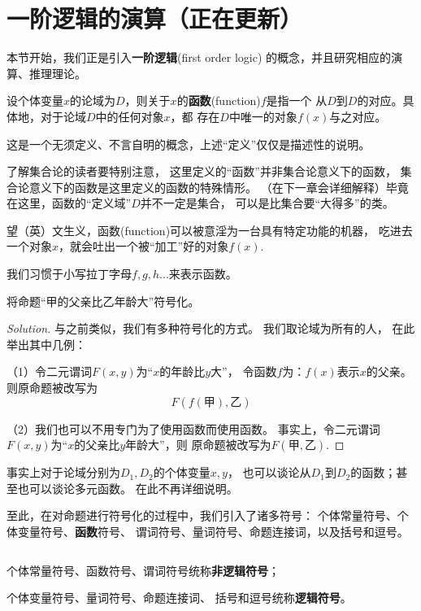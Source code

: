 \section{一阶逻辑的演算（正在更新）}

本节开始，我们正是引入\textbf{一阶逻辑}(first order logic)
的概念，并且研究相应的演算、推理理论。

\begin{definition}[函数与函数符号]
设个体变量$x$的论域为$D$，则关于$x$的\textbf{函数}(function)$f$是指一个
从$D$到$D$的对应。具体地，对于论域$D$中的任何对象$x$，都
存在$D$中唯一的对象$f(x)$与之对应。
\end{definition}

这是一个无须定义、不言自明的概念，上述“定义”仅仅是描述性的说明。

了解集合论的读者要特别注意，
这里定义的“函数”并非集合论意义下的函数，
集合论意义下的函数是这里定义的函数的特殊情形。
（在下一章会详细解释）毕竟在这里，函数的“定义域”$D$并不一定是集合，
可以是比集合要“大得多”的类。

望（英）文生义，函数(function)可以被意淫为一台具有特定功能的机器，
吃进去一个对象$x$，就会吐出一个被“加工”好的对象$f(x)$.

我们习惯于小写拉丁字母$f,g,h...$来表示函数。

\begin{example}
将命题“甲的父亲比乙年龄大”符号化。
\end{example}
\begin{proof}[Solution]
与之前类似，我们有多种符号化的方式。
我们取论域为所有的人，
在此举出其中几例：

（1）令二元谓词$F(x,y)$为“$x$的年龄比$y$大”，
令函数$f$为：$f(x)$表示$x$的父亲。
则原命题被改写为
$$F(f(\text{甲}),\text{乙})$$

（2）我们也可以不用专门为了使用函数而使用函数。
事实上，令二元谓词$F(x,y)$为“$x$的父亲比$y$年龄大”，则
原命题被改写为$F(\text{甲},\text{乙})$.
\end{proof}

事实上对于论域分别为$D_1,D_2$的个体变量$x,y$，
也可以谈论从$D_1$到$D_2$的函数；甚至也可以谈论多元函数。
在此不再详细说明。\vs

至此，在对命题进行符号化的过程中，我们引入了诸多符号：
个体常量符号、个体变量符号、\textbf{函数}符号、
谓词符号、量词符号、命题连接词，以及括号和逗号。

\begin{definition}[逻辑符号与非逻辑符号]$\,$

个体常量符号、函数符号、谓词符号统称\textbf{非逻辑符号}；

个体变量符号、量词符号、命题连接词、
括号和逗号统称\textbf{逻辑符号}。
\end{definition}



